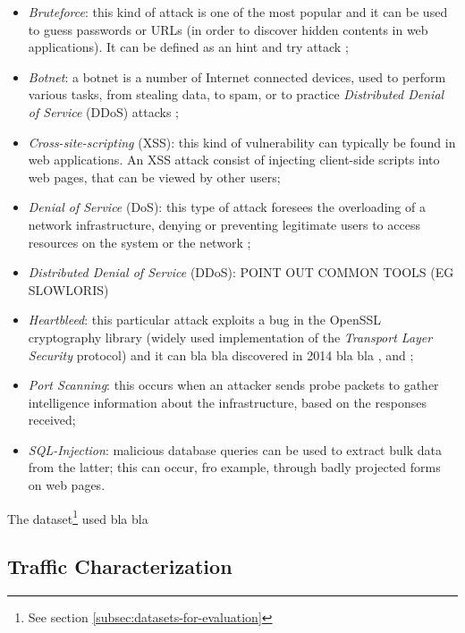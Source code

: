 \begin{itemize}
    \item[\faCaretRight] \textit{Bruteforce}: this kind of attack is one of the most popular and it can be used to guess passwords or URLs (in order to discover hidden contents in web applications). It can be defined as an hint and try attack \cite{icissp18};
    \item[\faCaretRight] \textit{Botnet}: a botnet is a number of Internet connected devices, used to perform various tasks, from stealing data, to spam, or to practice \textit{Distributed Denial of Service} (DDoS) attacks \cite{icissp18};
    \item[\faCaretRight] \textit{Cross-site-scripting} (XSS): this kind of vulnerability can typically be found in web applications. An XSS attack consist of injecting client-side scripts into web pages, that can be viewed by other users;
    \item[\faCaretRight] \textit{Denial of Service} (DoS): this type of attack foresees the overloading of a network infrastructure, denying or preventing legitimate users to access resources on the system or the network \cite{Sharafaldin2019};
    \item[\faCaretRight] \textit{Distributed Denial of Service} (DDoS): POINT OUT COMMON TOOLS (EG SLOWLORIS)
    \item[\faCaretRight] \textit{Heartbleed}: this particular attack exploits a bug in the OpenSSL cryptography library (widely used implementation of the \textit{Transport Layer Security} protocol) and it can bla bla discovered in 2014 bla bla \cite{icissp18}, \cite{Carvalho2014} and \cite{Stallings2014};
    \item[\faCaretRight] \textit{Port Scanning}: this occurs when an attacker sends probe packets to gather intelligence information about the infrastructure, based on the responses received;
    \item[\faCaretRight] \textit{SQL-Injection}: malicious database queries can be used to extract bulk data from the latter; this can occur, fro example, through badly projected forms on web pages.
\end{itemize}
The dataset\footnote{See section \ref{subsec:datasets-for-evaluation}} used bla bla


\subsection{Traffic Characterization}
\label{subsec:traffic-characterization}

